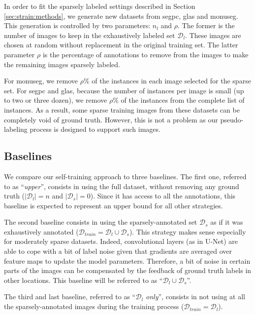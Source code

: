 In order to fit the sparsely labeled settings described in Section \ref{sec:strain:methods}, we generate new datasets from \acrshort{segpc}, \acrshort{glas} and \acrshort{monuseg}. This generation is controlled by two parameters: $n_l$ and $\rho$. The former is the number of images to keep in the exhaustively labeled set $\mathcal{D}_l$. These images are chosen at random without replacement in the original training set. The latter parameter $\rho$ is the percentage of annotations to remove from the images to make the remaining images sparsely labeled.

For \acrshort{monuseg}, we remove $\rho \%$ of the instances in each image selected for the sparse set. For \acrshort{segpc} and \acrshort{glas}, because the number of instances per image is small (up to two or three dozen), we remove $\rho \%$ of the instances from the complete list of instances. As a result, some sparse training images from these  datasets can be completely void of ground truth. However, this is not a problem as our pseudo-labeling process is designed to support such images. 

\subsection{Baselines}
\label{ssec:strain:baselines}

We compare our self-training approach to three baselines. The first one, referred to as ``\textit{upper}'', consists in using the full dataset, without removing any ground truth (\ie $|\mathcal{D}_l| = n$ and $|\mathcal{D}_s| = 0$). Since it has access to all the annotations, this baseline is expected to represent an upper bound for all other strategies. 

The second baseline consists in using the sparsely-annotated set $\mathcal{D}_s$ as if it was exhaustively annotated ($\mathcal{D}_{train} = \mathcal{D}_l \cup \mathcal{D}_s$). This strategy makes sense especially for moderately sparse datasets. Indeed, convolutional layers (as in U-Net) are able to cope with a bit of label noise given that gradients are averaged over feature maps to update the model parameters. Therefore, a bit of noise in certain parts of the images can be compensated by the feedback of ground truth labels in other locations. This baseline will be referred to as ``$\mathcal{D}_l \cup \mathcal{D}_s$''.

The third and last baseline, referred to as ``\textit{$\mathcal{D}_l$ only}'', consists in not using at all the sparsely-annotated images during the training process (\ie $\mathcal{D}_{train} = \mathcal{D}_l$).

